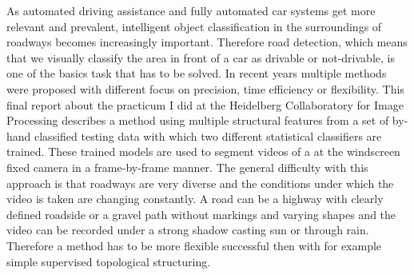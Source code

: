 As automated driving assistance and fully automated car systems get more relevant and prevalent, intelligent object classification in the surroundings of roadways becomes increasingly important. Therefore road detection, which means that we visually classify the area in front of a car as drivable or not-drivable, is one of the basics task that has to be solved. In recent years multiple methods were proposed with different focus on precision, time efficiency or flexibility. This final report about the practicum I did at the Heidelberg Collaboratory for Image Processing describes a method using multiple structural features from a set of by-hand classified testing data with which two different statistical classifiers are trained. These trained models are used to segment videos of a at the windscreen fixed camera in a frame-by-frame manner. The general difficulty with this approach is that roadways are very diverse and the conditions under which the video is taken are changing constantly. A road can be a highway with clearly defined roadside or a gravel path without markings and varying shapes and the video can be recorded under a strong shadow casting sun or through rain. Therefore a method has to be more flexible successful then with for example simple supervised topological structuring.